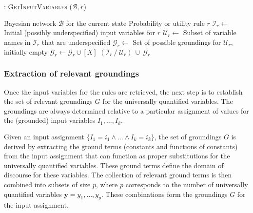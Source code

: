 \begin{algorithm}[h!]
\caption{: \textsc{GetInputVariables} ($\mathcal{B}, \mathit{r}$)}
\begin{algorithmic}[1] \vspace{1mm}
\REQUIRE Bayesian network $\mathcal{B}$ for the current state
\REQUIRE Probability or utility rule $\mathit{r}$ \vspace{1mm}
\STATE $\mathcal{I}_{r} \leftarrow $ Initial (possibly underspecified) input variables for $\mathit{r}$
\STATE $\mathcal{U}_{r} \leftarrow $ Subset of variable names in $\mathcal{I}_{r}$ that are underspecified
\STATE $\mathcal{G}_{r} \leftarrow$ Set of possible groundings for $\mathcal{U}_{r}$, initially empty
\STATE $\mathcal{G}_{r} \leftarrow \mathcal{G}_{r} \cup [X]$
\ENDIF
\ENDFOR
\ENDFOR
\RETURN $(\mathcal{I}_{r} \ / \ \mathcal{U}_{r}) \ \cup \  \mathcal{G}_{r}$
\end{algorithmic}
\label{algo:getinputvariables}
\end{algorithm}



\subsubsection*{Extraction of relevant groundings}

Once the input variables for the rules are retrieved, the next step is to establish the set of relevant groundings $G$ for the universally quantified variables.  The groundings are always determined relative to a particular assignment of values for the (grounded) input variables $I_1, \dots, I_k$.

Given an input assignment $\{I_1\!=\!i_1 \land \dots \land I_k\!=\!i_k\}$, the set of groundings $G$ is derived by extracting the ground terms (constants and functions of constants) from the input assignment that can function as proper substitutions for the universally quantified variables.  These ground terms define the domain of discourse for these variables. The collection of relevant ground terms is then combined into subsets of size $p$, where $p$ corresponds to the number of universally quantified variables $\mathbf{y} = y_1, \dots, y_p$. These combinations form the groundings $G$ for the input assignment. 


